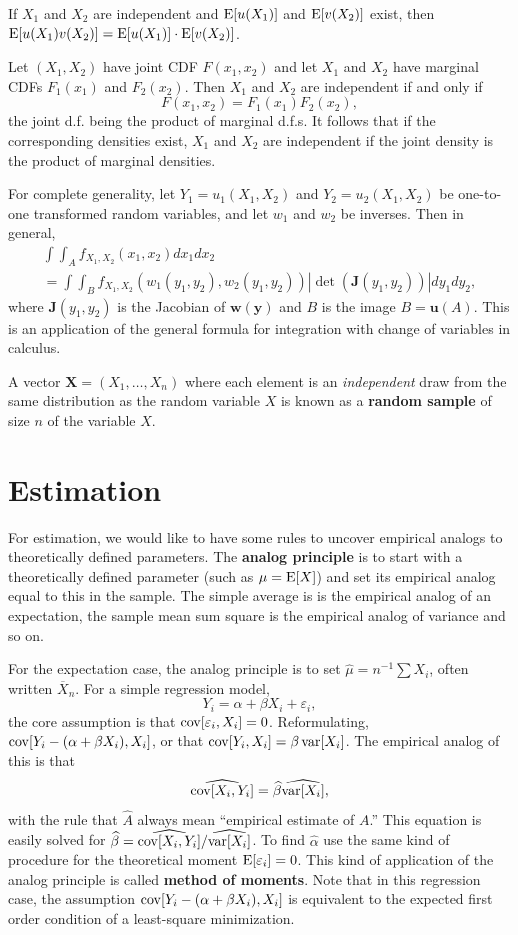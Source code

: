 \documentclass[twoside]{article}
\begin{document}
If $X_1$ and $X_2$ are independent and $\operatorname{E}[u(X_1)]$ and $\operatorname{E}[v(X_2)]$ exist, then
$\operatorname{E}[u(X_1)v(X_2)] = \operatorname{E}[u(X_1)]\cdot \operatorname{E}[v(X_2)]$.


Let $(X_1,X_2)$ have joint CDF
  $F(x_1,x_2)$ and let $X_1$ and $X_2$ have marginal CDFs $F_1(x_1)$
  and $F_2(x_2)$. Then $X_1$ and $X_2$ are independent if and only if 
  \[F(x_1,x_2)= F_1(x_1) F_2(x_2),\]
  the joint d.f. being the product of marginal d.f.s. It follows that if the corresponding
  densities exist, $X_1$ and $X_2$ are independent if the joint
  density is the product of marginal densities.



For complete generality, let $Y_1=u_1(X_1,X_2)$ and $Y_2=u_2(X_1,X_2)$ be
one-to-one transformed random variables, and let $w_1$ and $w_2$ be inverses.
Then in general, 
\begin{multline*} \int\!\!\!\int_A f_{X_1,X_2}(x_1,x_2)dx_1 d x_2 \\
= \int\!\!\!\int_B
f_{X_1,X_2} (w_1(y_1,y_2),w_2(y_1,y_2))| \det(\mathbf{J}(y_1,y_2))| d y_1
dy_2,\end{multline*} 
where $\mathbf{J}(y_1,y_2)$ is the Jacobian of $\mathbf{w}(\mathbf{y})$ and $B$ is
the image $B=\mathbf{u}(A)$. This is an application of the general formula
for integration with change of variables in calculus.


A vector $\mathbf{X}=(X_1,\dots,X_n)$ where each element is an
\emph{independent} draw from the same distribution as the random variable $X$ is
known as a \textbf{random sample} of size $n$ of the variable $X$.

\section{Estimation}

For estimation, we would like to have some rules to uncover empirical analogs
to theoretically defined parameters. The \textbf{analog principle} is to 
start with a theoretically defined parameter (such as $\mu=\operatorname{E}[X]$) and set its
empirical analog equal to this in the sample. The simple average is is the
empirical analog of an expectation, the sample mean sum square is the empirical
analog of variance and so on. 

For the expectation case, the analog principle is to set $\widehat{\mu} = n^{-1}\sum X_i$,
often written $\overline{X}_n$. For a simple regression model,
\[ Y_i = \alpha + \beta X_i + \varepsilon_i,\] the core assumption is that $\operatorname{cov}[\varepsilon_i,X_i]=0$.
Reformulating, $\operatorname{cov}[Y_i - (\alpha + \beta X_i), X_i]$, or that $\operatorname{cov}[Y_i,X_i] = \beta \operatorname{var}[X_i]$.
The empirical analog of this is that
\[ \widehat{\operatorname{cov}[X_i,Y_i]} = \widehat{\beta} \widehat{\operatorname{var}[X_i]},\]
with the rule that $\widehat{A}$ always mean ``empirical estimate of $A$.'' This equation
is easily solved for $\widehat{\beta} = \widehat{\operatorname{cov}[X_i,Y_i]} / \widehat{\operatorname{var}[X_i]}$. To find
$\widehat{\alpha}$ use the same kind of procedure for the theoretical moment $\operatorname{E}[\varepsilon_i]=0$. This kind
of application of the analog principle is called \textbf{method of moments}. Note
that in this regression case, the assumption $\operatorname{cov}[Y_i - (\alpha + \beta X_i), X_i]$ is equivalent
to the expected first order condition of a least-square minimization.
\end{document}
